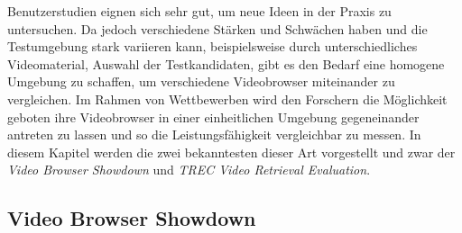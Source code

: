 \documentclass[11pt,a4paper]{report}
\begin{document}
Benutzerstudien eignen sich sehr gut, um neue Ideen in der Praxis zu untersuchen. Da jedoch verschiedene Stärken und Schwächen haben und die Testumgebung stark variieren kann, beispielsweise durch unterschiedliches Videomaterial, Auswahl der Testkandidaten, gibt es den Bedarf eine homogene Umgebung zu schaffen, um verschiedene Videobrowser miteinander zu vergleichen. Im Rahmen von Wettbewerben wird den Forschern die Möglichkeit geboten ihre Videobrowser in einer einheitlichen Umgebung gegeneinander antreten zu lassen und so die Leistungsfähigkeit vergleichbar zu messen. In diesem Kapitel werden die zwei bekanntesten dieser Art vorgestellt und zwar der \emph{Video Browser Showdown} und \emph{TREC Video Retrieval Evaluation}.

\subsection{Video Browser Showdown}
\end{document}
